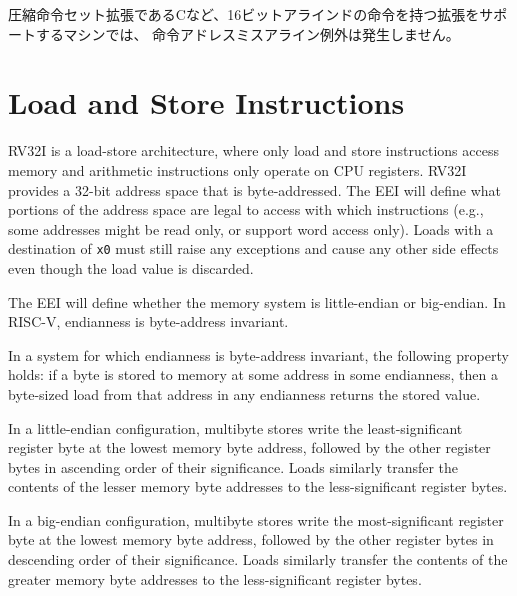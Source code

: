 \begin{commentary}
\begin{comment}
Instruction-address-misaligned exceptions are not possible on machines
that support extensions with 16-bit aligned instructions, such as the
compressed instruction-set extension, C.
\end{comment}

圧縮命令セット拡張であるCなど、16ビットアラインドの命令を持つ拡張をサポートするマシンでは、
命令アドレスミスアライン例外は発生しません。
\end{commentary}

\section{Load and Store Instructions}
\label{sec:rv32:ldst}

RV32I is a load-store architecture, where only load and store
instructions access memory and arithmetic instructions only operate on
CPU registers.  RV32I provides a 32-bit address space that is
byte-addressed.
The EEI will define what portions of the address space are legal to access with
which instructions (e.g., some addresses might be read only, or
support word access only).  Loads with a destination of {\tt x0} must
still raise any exceptions and cause any other side effects even
though the load value is discarded.

The EEI will define whether the memory system is little-endian or big-endian.
In RISC-V, endianness is byte-address invariant.
\begin{commentary}
In a system for which endianness is byte-address invariant, the following
property holds: if a byte is stored to memory at some address in some
endianness, then a byte-sized load from that address in any endianness returns
the stored value.

In a little-endian configuration, multibyte stores write the least-significant
register byte at the lowest memory byte address, followed by the other
register bytes in ascending order of their significance.
Loads similarly transfer the contents of the lesser memory byte addresses to
the less-significant register bytes.

In a big-endian configuration, multibyte stores write the most-significant
register byte at the lowest memory byte address, followed by the other
register bytes in descending order of their significance.
Loads similarly transfer the contents of the greater memory byte addresses to
the less-significant register bytes.
\end{commentary}


